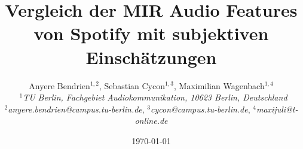 \documentclass[a4paper, 10pt, twocolumn]{article}
\begin{document}
\date{}                                         %

\title{\vspace{-8mm}\textbf{\large
Vergleich der MIR Audio Features von Spotify mit subjektiven Einschätzungen }}

\author{
Anyere Bendrien$^{1,2}$, Sebastian Cycon$^{1,3}$, Maximilian Wagenbach$^{1,4}$\\\
$^{1}$\emph{\small TU Berlin, Fachgebiet Audiokommunikation, 10623 Berlin, Deutschland} \\
$^{2}$\emph{\small anyere.bendrien@campus.tu-berlin.de},
$^{3}$\emph{\small cycon@campus.tu-berlin.de},
$^{4}$\emph{\small maxijuli@t-online.de} }
\maketitle
\thispagestyle{empty}           %









\vfill%
\hfill\date{\today}
\end{document}
